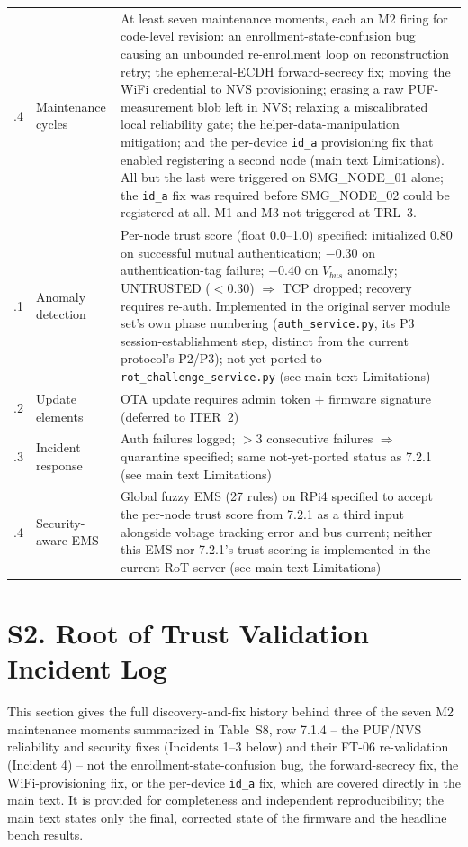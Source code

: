 \documentclass[12pt]{article}
\begin{document}
\begin{longtable}{
        >{\centering\arraybackslash}p{1.3cm}
        >{\raggedright\arraybackslash}p{3.7cm}
        >{\raggedright\arraybackslash}p{10.0cm}
    }
        7.1.4   & Maintenance cycles & At least seven maintenance moments, each an M2 firing for code-level revision: an enrollment-state-confusion bug causing an unbounded re-enrollment loop on reconstruction retry; the ephemeral-ECDH forward-secrecy fix; moving the WiFi credential to NVS provisioning; erasing a raw PUF-measurement blob left in NVS; relaxing a miscalibrated local reliability gate; the helper-data-manipulation mitigation; and the per-device \texttt{id\_a} provisioning fix that enabled registering a second node (main text Limitations). All but the last were triggered on SMG\_NODE\_01 alone; the \texttt{id\_a} fix was required before SMG\_NODE\_02 could be registered at all. M1 and M3 not triggered at TRL~3. \\
        7.2.1   & Anomaly detection & Per-node trust score (float 0.0--1.0) specified: initialized 0.80 on successful mutual authentication; $-0.30$ on authentication-tag failure; $-0.40$ on $V_{bus}$ anomaly; UNTRUSTED ($<0.30$) $\Rightarrow$ TCP dropped; recovery requires re-auth. Implemented in the original server module set's own phase numbering (\texttt{auth\_service.py}, its P3 session-establishment step, distinct from the current protocol's P2/P3); not yet ported to \texttt{rot\_challenge\_service.py} (see main text Limitations) \\
        7.2.2   & Update elements & OTA update requires admin token + firmware signature (deferred to ITER~2) \\
        7.2.3   & Incident response & Auth failures logged; $>3$ consecutive failures $\Rightarrow$ quarantine specified; same not-yet-ported status as 7.2.1 (see main text Limitations) \\
        7.2.4   & Security-aware EMS & Global fuzzy EMS (27 rules) on RPi4 specified to accept the per-node trust score from 7.2.1 as a third input alongside voltage tracking error and bus current; neither this EMS nor 7.2.1's trust scoring is implemented in the current RoT server (see main text Limitations) \\
    \end{longtable}
    \endgroup

\section*{S2. Root of Trust Validation Incident Log}
\label{sec:incidentlog}

This section gives the full discovery-and-fix history behind three of the seven M2 maintenance moments summarized in Table~S8, row 7.1.4 -- the PUF/NVS reliability and security fixes (Incidents 1--3 below) and their FT-06 re-validation (Incident 4) -- not the enrollment-state-confusion bug, the forward-secrecy fix, the WiFi-provisioning fix, or the per-device \texttt{id\_a} fix, which are covered directly in the main text. It is provided for completeness and independent reproducibility; the main text states only the final, corrected state of the firmware and the headline bench results.
\end{document}
